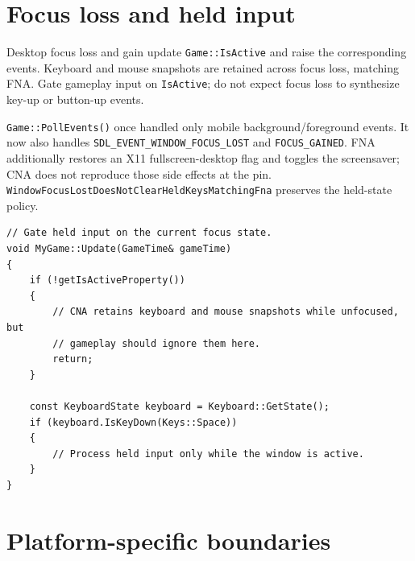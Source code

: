 \section{Focus loss and held input}

\begin{contractnote}
Desktop focus loss and gain update \texttt{Game::IsActive} and raise the corresponding events.
Keyboard and mouse snapshots are retained across focus loss, matching FNA. Gate gameplay input on
\texttt{IsActive}; do not expect focus loss to synthesize key-up or button-up events.
\end{contractnote}

\begin{historynote}
\texttt{Game::PollEvents()} once handled only mobile background/foreground events. It now also
handles \texttt{SDL\_EVENT\_WINDOW\_FOCUS\_LOST} and \texttt{FOCUS\_GAINED}. FNA additionally
restores an X11 fullscreen-desktop flag and toggles the screensaver; CNA does not reproduce those
side effects at the pin. \texttt{WindowFocusLostDoesNotClearHeldKeysMatchingFna} preserves the
held-state policy.
\end{historynote}

\begin{lstlisting}
// Gate held input on the current focus state.
void MyGame::Update(GameTime& gameTime)
{
    if (!getIsActiveProperty())
    {
        // CNA retains keyboard and mouse snapshots while unfocused, but
        // gameplay should ignore them here.
        return;
    }

    const KeyboardState keyboard = Keyboard::GetState();
    if (keyboard.IsKeyDown(Keys::Space))
    {
        // Process held input only while the window is active.
    }
}
\end{lstlisting}

\section{Platform-specific boundaries}

